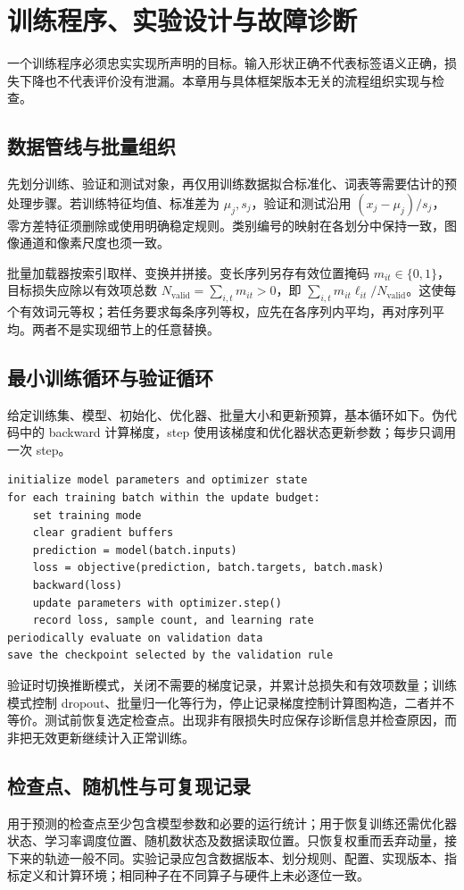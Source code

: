 \setcounter{chapter}{8} %
\chapter{训练程序、实验设计与故障诊断}
\label{chap:dl-engineering}
一个训练程序必须忠实实现所声明的目标。输入形状正确不代表标签语义正确，损失下降也不代表评价没有泄漏。本章用与具体框架版本无关的流程组织实现与检查。

\section{数据管线与批量组织}
先划分训练、验证和测试对象，再仅用训练数据拟合标准化、词表等需要估计的预处理步骤。若训练特征均值、标准差为 $\mu_j,s_j$，验证和测试沿用 $(x_j-\mu_j)/s_j$，零方差特征须删除或使用明确稳定规则。类别编号的映射在各划分中保持一致，图像通道和像素尺度也须一致。

批量加载器按索引取样、变换并拼接。变长序列另存有效位置掩码 $m_{it}\in\{0,1\}$，目标损失应除以有效项总数 $N_{\mathrm{valid}}=\sum_{i,t}m_{it}>0$，即 $\sum_{i,t}m_{it}\ell_{it}/N_{\mathrm{valid}}$。这使每个有效词元等权；若任务要求每条序列等权，应先在各序列内平均，再对序列平均。两者不是实现细节上的任意替换。

\section{最小训练循环与验证循环}
给定训练集、模型、初始化、优化器、批量大小和更新预算，基本循环如下。伪代码中的 backward 计算梯度，step 使用该梯度和优化器状态更新参数；每步只调用一次 step。
\begin{verbatim}
initialize model parameters and optimizer state
for each training batch within the update budget:
    set training mode
    clear gradient buffers
    prediction = model(batch.inputs)
    loss = objective(prediction, batch.targets, batch.mask)
    backward(loss)
    update parameters with optimizer.step()
    record loss, sample count, and learning rate
periodically evaluate on validation data
save the checkpoint selected by the validation rule
\end{verbatim}
验证时切换推断模式，关闭不需要的梯度记录，并累计总损失和有效项数量；训练模式控制 dropout、批量归一化等行为，停止记录梯度控制计算图构造，二者并不等价。测试前恢复选定检查点。出现非有限损失时应保存诊断信息并检查原因，而非把无效更新继续计入正常训练。

\section{检查点、随机性与可复现记录}
用于预测的检查点至少包含模型参数和必要的运行统计；用于恢复训练还需优化器状态、学习率调度位置、随机数状态及数据读取位置。只恢复权重而丢弃动量，接下来的轨迹一般不同。实验记录应包含数据版本、划分规则、配置、实现版本、指标定义和计算环境；相同种子在不同算子与硬件上未必逐位一致。

